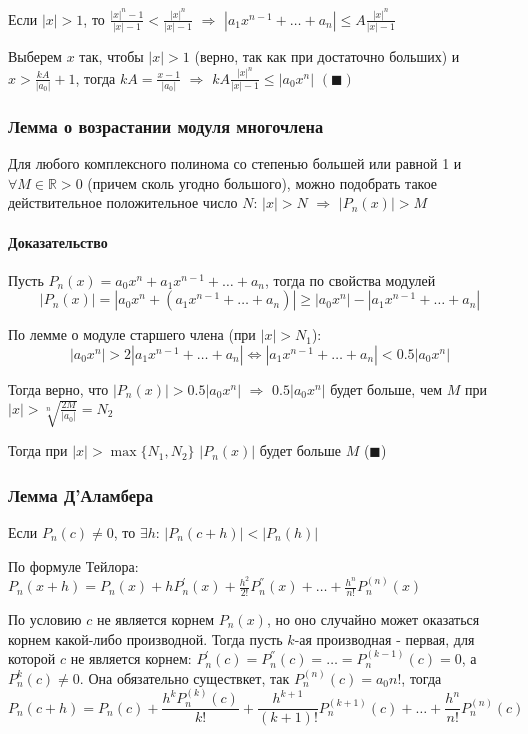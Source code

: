 \documentclass[class=article,a4paper,12pt,crop=false]{standalone}
\begin{document}
Если $|x| > 1$, то $\frac{|x|^n - 1}{|x| - 1} < \frac{|x|^n}{|x| - 1}$ $\Rightarrow$
$|a_1x^{n - 1} + \dots + a_n| \leq A\frac{|x|^n}{|x| - 1}$

Выберем $x$ так, чтобы $|x| > 1$ (верно, так как при достаточно больших) и
$x > \frac{kA}{|a_0|} + 1$, тогда $kA = \frac{x - 1}{|a_0|}$ $\Rightarrow$
$kA\frac{|x|^n}{|x| - 1} \leq |a_0x^n|$ $(\blacksquare)$

\subsubsection{Лемма о возрастании модуля многочлена}

Для любого комплексного полинома со степенью большей или равной 1 и $\forall M \in \mathbb{R} > 0$
(причем сколь угодно большого), можно подобрать такое действительное положительное число $N$:
$|x| > N$ $\Rightarrow$ $|P_n(x)| > M$

\paragraph{Доказательство} Пусть $P_n(x) = a_0x^n + a_1x^{n - 1} + \dots + a_n$, тогда
по свойства модулей \[|P_n(x)| = |a_0x^n + (a_1x^{n - 1} + \dots + a_n)|
\geq |a_0x^n| - |a_1x^{n - 1} + \dots + a_n|\]

По лемме о модуле старшего члена (при $|x| > N_1$):
\begin{equation}
    |a_0x^n| > 2|a_1x^{n - 1} + \dots + a_n| \Leftrightarrow
    |a_1x^{n - 1} + \dots + a_n| < 0.5|a_0x^n|
\end{equation}

Тогда верно, что $|P_n(x)| > 0.5|a_0x^n|$ $\Rightarrow$ $0.5|a_0x^n|$ будет больше, чем $M$
при $|x| > \sqrt[n]{\frac{2M}{|a_0|}} = N_2$

Тогда при $|x| > \max\{N_1, N_2\}$ $|P_n(x)|$ будет больше $M$ ($\blacksquare$)

\subsubsection{Лемма Д'Аламбера}

Если $P_n(c) \neq 0$, то $\exists h$: $|P_n(c + h)| < |P_n(h)|$

По формуле Тейлора: $P_n(x + h) = P_n(x) + hP_n^{'}(x) + \frac{h^2}{2!}P_n^{''}(x) + \dots + \frac{h^n}{n!}P_n^{(n)}(x)$

По условию $c$ не является корнем $P_n(x)$, но оно случайно может оказаться корнем какой-либо
производной. Тогда пусть $k$-ая производная - первая, для которой
$c$ не является корнем: $P_n^{'}(c) = P_n^{''}(c) = \dots = P_n^{(k - 1)}(c) = 0$, а
$P_n^{k}(c) \neq 0$. Она обязательно существкет, так $P_n^{(n)}(c) = a_0n!$, тогда
\begin{equation}
    P_n(c + h) = P_n(c) + \frac{h^kP_n^{(k)}(c)}{k!} + \frac{h^{k + 1}}{(k + 1)!}P_n^{(k + 1)}(c) + \dots + \frac{h^n}{n!}P_n^{(n)}(c)
\end{equation}
\end{document}
